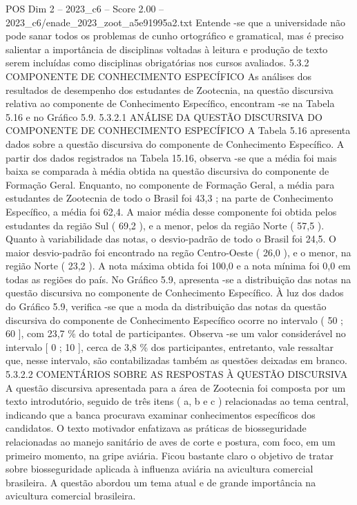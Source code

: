 \begin{textsample}{POS Dim 2 – 2023\_c6 – Score 2.00 – 2023\_c6/enade\_2023\_zoot\_a5e91995a2.txt}
Entende -se que a universidade não pode sanar todos os problemas de cunho ortográfico e gramatical, mas é preciso salientar a importância de disciplinas voltadas à leitura e produção de texto serem incluídas como disciplinas obrigatórias nos cursos avaliados. 5.3.2 COMPONENTE DE CONHECIMENTO ESPECÍFICO As análises dos resultados de desempenho dos estudantes de Zootecnia, na questão discursiva relativa ao componente de Conhecimento Específico, encontram -se na Tabela 5.16 e no Gráfico 5.9. 5.3.2.1 ANÁLISE DA QUESTÃO DISCURSIVA DO COMPONENTE DE CONHECIMENTO ESPECÍFICO A Tabela 5.16 apresenta dados sobre a questão discursiva do componente de Conhecimento Específico.
A partir dos dados registrados na Tabela 15.16, observa -se que a média foi mais baixa se comparada à média obtida na questão discursiva do componente de Formação Geral.
Enquanto, no componente de Formação Geral, a média para estudantes de Zootecnia de todo o Brasil foi 43,3 ; na parte de Conhecimento Específico, a média foi 62,4.
A maior média desse componente foi obtida pelos estudantes da região Sul ( 69,2 ), e a menor, pelos da região Norte ( 57,5 ).
Quanto à variabilidade das notas, o desvio-padrão de todo o Brasil foi 24,5.
O maior desvio-padrão foi encontrado na regão Centro-Oeste ( 26,0 ), e o menor, na região Norte ( 23,2 ).
A nota máxima obtida foi 100,0 e a nota mínima foi 0,0 em todas as regiões do país.
No Gráfico 5.9, apresenta -se a distribuição das notas na questão discursiva no componente de Conhecimento Específico.
À luz dos dados do Gráfico 5.9, verifica -se que a moda da distribuição das notas da questão discursiva do componente de Conhecimento Específico ocorre no intervalo ( 50 ; 60 ], com 23,7 \% do total de participantes.
Observa -se um valor considerável no intervalo [ 0 ; 10 ], cerca de 3,8 \% dos participantes, entretanto, vale ressaltar que, nesse intervalo, são contabilizadas também as questões deixadas em branco. 5.3.2.2 COMENTÁRIOS SOBRE AS RESPOSTAS À QUESTÃO DISCURSIVA A questão discursiva apresentada para a área de Zootecnia foi composta por um texto introdutório, seguido de três itens ( a, b e c ) relacionadas ao tema central, indicando que a banca procurava examinar conhecimentos específicos dos candidatos.
O texto motivador enfatizava as práticas de biosseguridade relacionadas ao manejo sanitário de aves de corte e postura, com foco, em um primeiro momento, na gripe aviária.
Ficou bastante claro o objetivo de tratar sobre biosseguridade aplicada à influenza aviária na avicultura comercial brasileira.
A questão abordou um tema atual e de grande importância na avicultura comercial brasileira.

\end{textsample}
